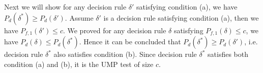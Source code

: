 Next we will show for any decision rule $\delta'$ satisfying condition (a), we have $P_d(\delta^\ast) \geq P_d(\delta')$.  
Assume $\delta'$ is a decision rule satisfying condition (a), then we have  $P_{f,1}(\delta') \leq c$.
We proved for any decision rule $\delta$ satisfying $P_{f, 1}(\delta) \leq c$, we have $P_d(\delta) \leq P_d(\delta^\ast)$.  
Hence it  can be concluded that  $P_d(\delta^\ast) \geq P_d(\delta')$, i.e. 
decision rule $\delta^\ast$ also satisfies condition (b). Since decision rule $\delta^\ast$ satisfies both condition (a) and (b), it is the UMP test of size $c$.    



